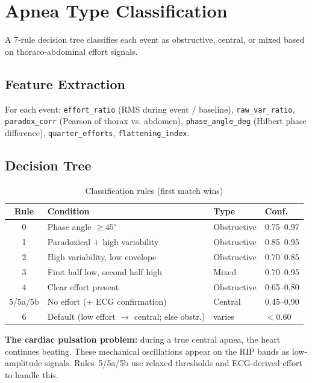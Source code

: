 \documentclass[11pt,a4paper]{article}
\begin{document}
\section{Apnea Type Classification}

A 7-rule decision tree classifies each event as obstructive, central,
or mixed based on thoraco-abdominal effort signals.

\subsection{Feature Extraction}
For each event: \texttt{effort\_ratio} (RMS during event / baseline),
\texttt{raw\_var\_ratio}, \texttt{paradox\_corr} (Pearson of thorax vs.
abdomen), \texttt{phase\_angle\_deg} (Hilbert phase difference),
\texttt{quarter\_efforts}, \texttt{flattening\_index}.

\subsection{Decision Tree}

\begin{table}[H]
\centering\small
\caption{Classification rules (first match wins)}
\begin{tabular}{@{}clll@{}}
\toprule
\textbf{Rule} & \textbf{Condition} & \textbf{Type} & \textbf{Conf.} \\
\midrule
0 & Phase angle $\geq 45^{\circ}$ & Obstructive & 0.75--0.97 \\
1 & Paradoxical + high variability & Obstructive & 0.85--0.95 \\
2 & High variability, low envelope & Obstructive & 0.70--0.85 \\
3 & First half low, second half high & Mixed & 0.70--0.95 \\
4 & Clear effort present & Obstructive & 0.65--0.80 \\
5/5a/5b & No effort (+ ECG confirmation) & Central & 0.45--0.90 \\
6 & Default (low effort $\to$ central; else obstr.) & varies & $<$0.60 \\
\bottomrule
\end{tabular}
\end{table}

\textbf{The cardiac pulsation problem:} during a true central apnea,
the heart continues beating. These mechanical oscillations appear on the
RIP bands as low-amplitude signals. Rules~5/5a/5b use relaxed
thresholds and ECG-derived effort to handle this.
\end{document}
